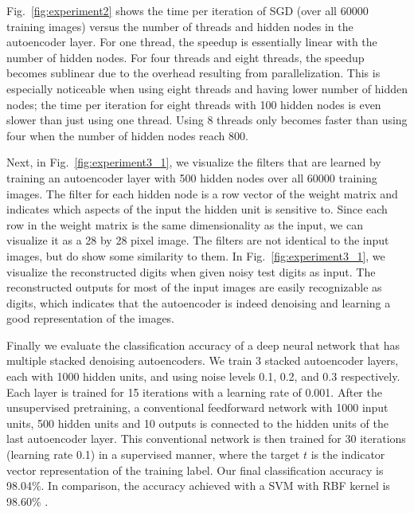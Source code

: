 \documentclass[conference]{IEEEtran}
\begin{document}
Fig.~\ref{fig:experiment2} shows the time per iteration of SGD (over all 60000 training images) versus the number of threads and hidden nodes in the autoencoder layer. For one thread, the speedup is essentially linear with the number of hidden nodes. For four threads and eight threads, the speedup becomes sublinear due to the overhead resulting from parallelization. This is especially noticeable when using eight threads and having lower number of hidden nodes; the time per iteration for eight threads with 100 hidden nodes is even slower than just using one thread. Using 8 threads only becomes faster than using four when the number of hidden nodes reach 800. 

Next, in Fig.~\ref{fig:experiment3_1}, we visualize the filters that are learned by training an autoencoder layer with 500 hidden nodes over all 60000 training images. The  filter for each hidden node is a row vector of the weight matrix and indicates which aspects of the input the hidden unit is sensitive to. Since each row in the weight matrix is the same dimensionality as the input, we can visualize it as a 28 by 28 pixel image. The filters are not identical to the input images, but do show some similarity to them. In Fig.~\ref{fig:experiment3_1}, we visualize the reconstructed digits when given noisy test digits as input. The reconstructed outputs for most of the input images are easily recognizable as digits, which indicates that the autoencoder is indeed denoising and learning a good representation of the images.

Finally we evaluate the classification accuracy of a deep neural network that has multiple stacked denoising autoencoders. We train 3 stacked autoencoder layers, each with 1000 hidden units, and using noise levels 0.1, 0.2, and 0.3 respectively. Each layer is trained for 15 iterations with a learning rate of 0.001. After the unsupervised pretraining, a conventional feedforward network with 1000 input units, 500 hidden units and 10 outputs is connected to the hidden units of the last autoencoder layer. This conventional network is then trained for 30 iterations (learning rate 0.1) in a supervised manner, where the target $t$ is the indicator vector representation of the training label. Our final classification accuracy is 98.04\%. In comparison, the accuracy achieved with a SVM with RBF kernel is 98.60\% \cite{vincent2010stacked}. 
\end{document}
